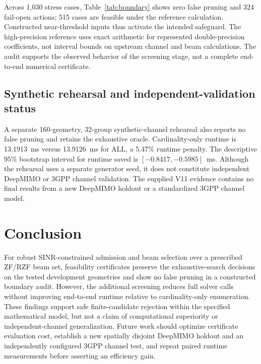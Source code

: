 \documentclass[journal]{IEEEtran}
\begin{document}
Across 1,030 stress cases, Table~\ref{tab:boundary} shows zero false pruning and 324 fail-open actions; 515 cases are feasible under the reference calculation. Constructed near-threshold inputs thus activate the intended safeguard. The high-precision reference uses exact arithmetic for represented double-precision coefficients, not interval bounds on upstream channel and beam calculations. The audit supports the observed behavior of the screening stage, not a complete end-to-end numerical certificate.

\subsection{Synthetic rehearsal and independent-validation status}
A separate 160-geometry, 32-group synthetic-channel rehearsal also reports no false pruning and retains the exhaustive oracle. Cardinality-only runtime is 13.1913~ms versus 13.9126~ms for ALL, a 5.47\% runtime penalty. The descriptive 95\% bootstrap interval for runtime saved is $[-0.8417,-0.5985]$~ms. Although the rehearsal uses a separate generator seed, it does not constitute independent DeepMIMO or 3GPP channel validation. The supplied V11 evidence contains no final results from a new DeepMIMO holdout or a standardized 3GPP channel model.

\section{Conclusion}
For robust SINR-constrained admission and beam selection over a prescribed ZF/RZF beam set, feasibility certificates preserve the exhaustive-search decisions on the tested development geometries and show no false pruning in a constructed boundary audit. However, the additional screening reduces full solver calls without improving end-to-end runtime relative to cardinality-only enumeration. These findings support safe finite-candidate rejection within the specified mathematical model, but not a claim of computational superiority or independent-channel generalization. Future work should optimize certificate evaluation cost, establish a new spatially disjoint DeepMIMO holdout and an independently configured 3GPP channel test, and repeat paired runtime measurements before asserting an efficiency gain.
\end{document}
